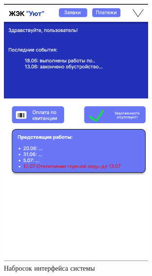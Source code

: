 \begin{figure}[h]
\centering
\includegraphics[width=0.7\textwidth]{Images/interface.png}
\caption{Набросок интерфейса системы}
\end{figure}
 